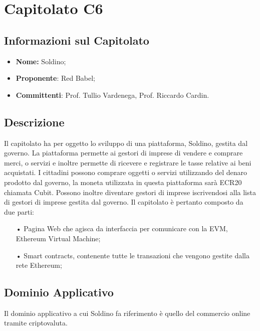 \section{Capitolato C6}
\subsection{Informazioni sul Capitolato}
\begin{itemize}
	\item \textbf{Nome:} Soldino;
	\item \textbf{Proponente}: Red Babel;
	\item \textbf{Committenti}: Prof. Tullio Vardenega, Prof. Riccardo Cardin.
\end{itemize}

\subsection{Descrizione}
Il capitolato ha per oggetto lo sviluppo di una piattaforma, Soldino, gestita dal governo. La piattaforma permette ai gestori di imprese di vendere e comprare merci, o servizi e inoltre permette di ricevere e registrare le tasse relative ai beni acquistati. \newline
I cittadini possono comprare oggetti o servizi utilizzando del denaro prodotto dal governo, la moneta utilizzata in questa piattaforma sarà ECR20 chiamata Cubit. Possono inoltre diventare gestori di imprese iscrivendosi alla lista di gestori di imprese gestita dal governo.  
Il capitolato è pertanto composto da due parti: 

\begin{itemize}

\item[•] Pagina Web che agisca da interfaccia per comunicare con la EVM, Ethereum Virtual Machine;
\item[•] Smart contracts, contenente tutte le transazioni che vengono gestite dalla rete Ethereum;

\end{itemize}

\subsection{Dominio Applicativo}
Il dominio applicativo a cui Soldino fa riferimento è quello del commercio online tramite criptovaluta. 

